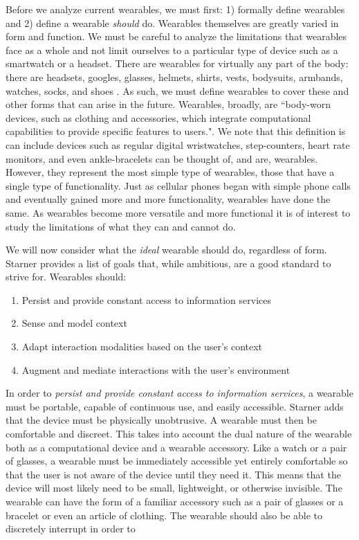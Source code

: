 \documentclass[11pt]{article}
\begin{document}
Before we analyze current wearables, we must first: 1) formally define wearables and 2) define a wearable \textit{should} do.  Wearables themselves are greatly varied in form and function. We must be careful to analyze the limitations that wearables face as a whole and not limit ourselves to a particular type of device such as a smartwatch or a headset. There are wearables for virtually any part of the body: there are headsets, googles, glasses, helmets, shirts, vests, bodysuits, armbands, watches, socks, and shoes \cite{VandricoList}. As such, we must define wearables to cover these and other forms that can arise in the future. Wearables, broadly, are ``body-worn devices, such as clothing and accessories, which integrate computational capabilities to provide specific features to users."\cite{WearableHumanView}. We note that this definition is can include devices such as regular digital wristwatches, step-counters, heart rate monitors, and even ankle-bracelets can be thought of, and are, wearables. However, they represent the most simple type of wearables, those that have a single type of functionality. Just as cellular phones began with simple phone calls and eventually gained more and more functionality, wearables have done the same. As wearables become more versatile and more functional it is of interest to study the limitations of what they can and cannot do. 

We will now consider what the \textit{ideal} wearable should do, regardless of form. Starner\cite{starnerChallenges1} provides a list of goals that, while ambitious, are a good standard to strive for. Wearables should:
\begin{enumerate}
    \item Persist and provide constant access to information services
    \item Sense and model context
    \item Adapt interaction modalities based on the user's context
    \item Augment and mediate interactions with the user's environment
\end{enumerate}

In order to \textit{persist and provide constant access to information services}, a wearable must be portable, capable of continuous use, and easily accessible. Starner adds that the device must be physically unobtrusive. A wearable must then be comfortable and discreet. This takes into account the dual nature of the wearable both as a computational device and a wearable accessory. Like a watch or a pair of glasses, a wearable must be immediately accessible yet entirely comfortable so that the user is not aware of the device until they need it.  This means that the device will most likely need to be small, lightweight, or otherwise invisible. The wearable can have the form of a familiar accessory such as a pair of glasses or a bracelet or even an article of clothing. The wearable should also be able to discretely interrupt in order to  
\end{document}
